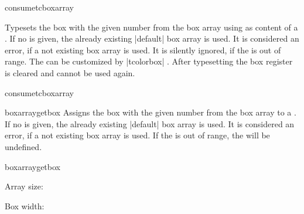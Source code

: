 \begin{docCommand}[doc new=2015-07-13]{consumetcboxarray}{}
\begin{articleside}[before skip=5pt]
Typesets the box with the given  number from the box array 
using  as content of a .
If no  is given, the already existing |default| box array is used.
It is considered an error, if a not existing box array  is used.
It is silently ignored, if the  is out of range.
The  can be customized by |tcolorbox| .
After typesetting the box register is cleared and cannot be used again.
\tcblower{}
\end{articleside}
\begin{exdispExample}{consumetcboxarray}
\begin{tcolorbox}[enhanced jigsaw,size=fbox,width=6cm,
colback=yellow!10,colframe=yellow!10!black,
enforce breakable,%
break at=5cm,
watermark text=\arabic{tcbbreakpart},
reset and store to box array
]
\lipsum[1]
\end{tcolorbox}

 \hfill {} \hfill {}
\end{exdispExample}
\end{docCommand}


\begin{docCommand}[doc new=2015-07-13]{boxarraygetbox}{}
Assigns the box with the given  number from the box array 
to a .
If no  is given, the already existing |default| box array is used.
It is considered an error, if a not existing box array  is used.
If the  is out of range, the  will be undefined.
\begin{exdispExample}{boxarraygetbox}

\boxarraygetsize{\mysize} Array size: \mysize

Box width: \the\wd\mybox
\quad\usebox{\mybox}
\end{exdispExample}
\end{docCommand}



